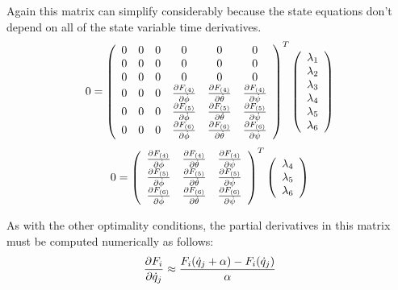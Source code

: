Again this matrix can simplify considerably because the state equations don't depend on all of the state variable time derivatives.
\begin{equation}
    0 = \left(
    \begin{array}{c c c c c c}
    0&0&0&0&0&0\\
    0&0&0&0&0&0\\
    0&0&0&0&0&0\\
    0&0&0 & \frac{\partial F_{(4)}}{\partial \dot \phi} & \frac{\partial F_{(4)}}{\partial \dot \theta} & \frac{\partial F_{(4)}}{\partial \dot \psi}\\
    0&0&0 & \frac{\partial F_{(5)}}{\partial \dot \phi} & \frac{\partial F_{(5)}}{\partial \dot \theta} & \frac{\partial F_{(5)}}{\partial \dot \psi}\\
    0&0&0 & \frac{\partial F_{(6)}}{\partial \dot \phi} & \frac{\partial F_{(6)}}{\partial \dot \theta} & \frac{\partial F_{(6)}}{\partial \dot \psi}\\
    \end{array}\right)^T\left(
    \begin{array}{c}
    \lambda_1\\
    \lambda_2\\
    \lambda_3\\
    \lambda_4\\
    \lambda_5\\
    \lambda_6\\
    \end{array}\right)
\end{equation}
\begin{equation}
    0 = \left(
    \begin{array}{c c c }
    \frac{\partial F_{(4)}}{\partial \dot \phi} & \frac{\partial F_{(4)}}{\partial \dot \theta} & \frac{\partial F_{(4)}}{\partial \dot \psi}\\
    \frac{\partial F_{(5)}}{\partial \dot \phi} & \frac{\partial F_{(5)}}{\partial \dot \theta} & \frac{\partial F_{(5)}}{\partial \dot \psi}\\
     \frac{\partial F_{(6)}}{\partial \dot \phi} & \frac{\partial F_{(6)}}{\partial \dot \theta} & \frac{\partial F_{(6)}}{\partial \dot \psi}\\
    \end{array}\right)^T\left(
    \begin{array}{c}
    \lambda_4\\
    \lambda_5\\
    \lambda_6\\
    \end{array}\right)
\end{equation}

As with the other optimality conditions, the partial derivatives in this matrix must be computed numerically as follows:
\begin{equation}
    \frac{\partial F_i}{\partial \dot q_j} \approx \frac{ F_i(\dot q_j + \alpha) - F_i(\dot q_j)  }{\alpha}
\end{equation}

